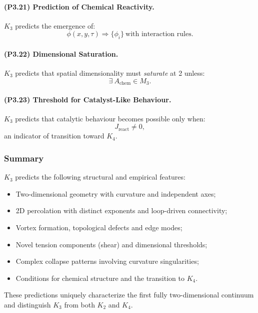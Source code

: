 \paragraph{(P3.21) Prediction of Chemical Reactivity.}
$K_3$ predicts the emergence of:
\[
\phi(x,y,\tau) \Rightarrow \{\phi_i\} \ \text{with interaction rules}.
\]

\paragraph{(P3.22) Dimensional Saturation.}
$K_3$ predicts that spatial dimensionality must \emph{saturate} at 2 unless:
\[
\exists \ A_{\mathrm{chem}} \in M_3.
\]

\paragraph{(P3.23) Threshold for Catalyst-Like Behaviour.}
$K_3$ predicts that catalytic behaviour becomes possible only when:
\[
J_{\mathrm{react}} \neq 0,
\]
an indicator of transition toward $K_4$.

\subsubsection{Summary}

$K_3$ predicts the following structural and empirical features:

\begin{itemize}
    \item Two-dimensional geometry with curvature and independent axes;
    \item 2D percolation with distinct exponents and loop-driven connectivity;
    \item Vortex formation, topological defects and edge modes;
    \item Novel tension components (shear) and dimensional thresholds;
    \item Complex collapse patterns involving curvature singularities;
    \item Conditions for chemical structure and the transition to $K_4$.
\end{itemize}

These predictions uniquely characterize the first fully two-dimensional
continuum and distinguish $K_3$ from both $K_2$ and $K_4$.
